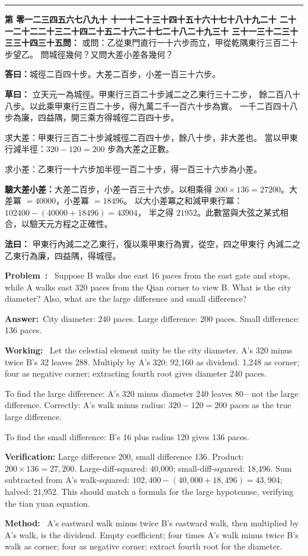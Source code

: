\documentclass[9pt,a4paper]{article}
\newcounter{probnum}
\newcounter{overallnum}
\newcommand{\chnum}[1]{%
  \ifcase#1 零\or 一\or 二\or 三\or 四\or 五\or 六\or 七\or 八\or 九\or 十\or
    十一\or 十二\or 十三\or 十四\or 十五\or 十六\or 十七\or 十八\or 十九\or 二十\or
    二十一\or 二十二\or 二十三\or 二十四\or 二十五\or 二十六\or 二十七\or 二十八\or 二十九\or 三十\or
    三十一\or 三十二\or 三十三\or 三十四\or 三十五\fi}
\newcommand{\problem}[1]{\stepcounter{probnum}\stepcounter{overallnum}\par\noindent\textbf{\color{volcolor}第\chnum{\value{probnum}}問：}#1\par\vspace{0.15cm}}
\newcommand{\answer}[1]{\par\noindent\textbf{答曰：}#1\par\vspace{0.15cm}}
\newcommand{\working}[1]{\par\noindent\textbf{草曰：}#1\par\vspace{0.15cm}}
\newcommand{\method}[1]{\par\noindent\textbf{法曰：}#1\par\vspace{0.25cm}}
\newcommand{\eproblem}[1]{\par\noindent\textbf{\color{volcolor}Problem~\theoverallnum:}~#1\par\vspace{0.15cm}}
\newcommand{\eanswer}[1]{\par\noindent\textbf{Answer:}~#1\par\vspace{0.15cm}}
\newcommand{\eworking}[1]{\par\noindent\textbf{Working:}~#1\par\vspace{0.15cm}}
\newcommand{\emethod}[1]{\par\noindent\textbf{Method:}~#1\par\vspace{0.25cm}}
\begin{document}
\vspace{0.15cm}
\noindent\rule{\textwidth}{0.2pt}
\vspace{0.15cm}

\noindent\begin{minipage}[t]{0.48\textwidth}
\problem{
或問：乙從東門直行一十六步而立，甲從乾隅東行三百二十步望乙。
問城徑幾何？又問大差小差各幾何？
}

\answer{城徑二百四十步。大差二百步，小差一百三十六步。}

\working{
立天元一為城徑。甲東行三百二十步減二之乙東行三十二步，
餘二百八十八步。以此乘甲東行三百二十步，得九萬二千一百六十步為實。
一千二百四十八步為廉，四益隅，開三乘方得城徑二百四十步。

求大差：甲東行三百二十步減城徑二百四十步，餘八十步，非大差也。
當以甲東行減半徑：$320 - 120 = 200$ 步為大差之正數。

求小差：乙東行一十六步加半徑一百二十步，得一百三十六步為小差。

\textbf{驗大差小差：}大差二百步，小差一百三十六步。以相乘得
$200 \times 136 = 27200$。大差冪 $= 40000$，小差冪 $= 18496$。
以大小差冪之和減甲東行冪：$102400 - (40000 + 18496) = 43904$，
半之得 $21952$。此數當與大弦之某式相合，以驗天元方程之正確性。
}

\method{
甲東行內減二之乙東行，復以乘甲東行為實，從空，四之甲東行
內減二之乙東行為廉，四益隅，得城徑。
}
\end{minipage}%
\hfill%
\begin{minipage}[t]{0.50\textwidth}
\eproblem{
Suppose B walks due east 16 paces from the east gate and stops, while A walks
east 320 paces from the Qian corner to view B. What is the city diameter?
Also, what are the large difference and small difference?
}

\eanswer{City diameter: 240 paces. Large difference: 200 paces. Small difference: 136 paces.}

\eworking{
Let the celestial element unity be the city diameter. A's 320 minus twice
B's 32 leaves 288. Multiply by A's 320: 92,160 as dividend. 1,248 as corner;
four as negative corner; extracting fourth root gives diameter 240 paces.

To find the large difference: A's 320 minus diameter 240 leaves 80---not the
large difference. Correctly: A's walk minus radius: $320 - 120 = 200$ paces
as the true large difference.

To find the small difference: B's 16 plus radius 120 gives 136 paces.

\textbf{Verification:} Large difference 200, small difference 136.
Product: $200 \times 136 = 27{,}200$. Large-diff-squared: 40,000;
small-diff-squared: 18,496. Sum subtracted from A's walk-squared:
$102{,}400 - (40{,}000 + 18{,}496) = 43{,}904$; halved: 21,952.
This should match a formula for the large hypotenuse, verifying the tian
yuan equation.
}

\emethod{
A's eastward walk minus twice B's eastward walk, then multiplied by A's walk,
is the dividend. Empty coefficient; four times A's walk minus twice B's walk
as corner; four as negative corner; extract fourth root for the diameter.
}
\end{minipage}
\vspace{0.15cm}
\end{document}
